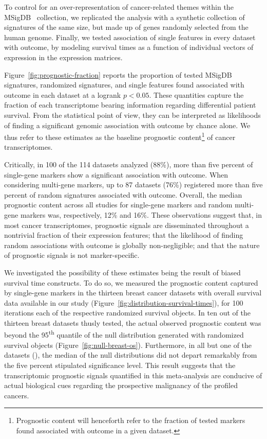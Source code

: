 To control for an over-representation of cancer-related themes within the
\mbox{MSigDB } collection, we replicated the analysis with a
synthetic collection of signatures of the same size, but made up of genes
randomly selected from the human genome.  Finally, we tested association of
single features in every dataset with outcome, by modeling survival times as a
function of individual vectors of expression in the expression matrices.

Figure~\ref{fig:prognostic-fraction} reports the proportion of tested
\mbox{MSigDB } signatures, randomized signatures, and single
features found associated with outcome in each dataset at a logrank $p<0.05$.
These quantities capture the fraction of each transcriptome bearing information
regarding differential patient survival.  From the statistical point of view,
they can be interpreted as likelihoods of finding a significant genomic
association with outcome by chance alone.  We thus refer to these estimates as
the baseline prognostic content\footnote{Prognostic content will henceforth
  refer to the fraction of tested markers found associated with outcome in a
  given dataset.} of cancer transcriptomes.

Critically, in 100 of the 114 datasets analyzed (88\%), more than five percent
of single-gene markers show a significant association with outcome.  When
considering multi-gene markers, up to 87 datasets (76\%) registered more than
five percent of random signatures associated with outcome.  Overall, the median
prognostic content across all studies for single-gene markers and random
multi-gene markers was, respectively, 12\% and 16\%.  These observations suggest
that, in most cancer transcriptomes, prognostic signals are disseminated
throughout a nontrivial fraction of their expression features; that the
likelihood of finding random associations with outcome is globally
non-negligible; and that the nature of prognostic signals is not
marker-specific.

We investigated the possibility of these estimates being the result of biased
survival time constructs.  To do so, we measured the prognostic content captured
by single-gene markers in the thirteen breast cancer datasets with overall
survival data available in our study
(Figure~\ref{fig:distribution-survival-times}), for \num{100} iterations each of
the respective randomized survival objects.  In ten out of the thirteen breast
datasets thusly tested, the actual observed prognostic content was beyond the
95\textsuperscript{th} quantile of the null distribution generated with
randomized survival objects (Figure~\ref{fig:null-breast-os}).  Furthermore, in
all but one of the datasets (), the median of the null
distributions did not depart remarkably from the five percent stipulated
significance level.  This result suggests that the transcriptomic prognostic
signals quantified in this meta-analysis are conducive of actual biological cues
regarding the prospective malignancy of the profiled cancers.

